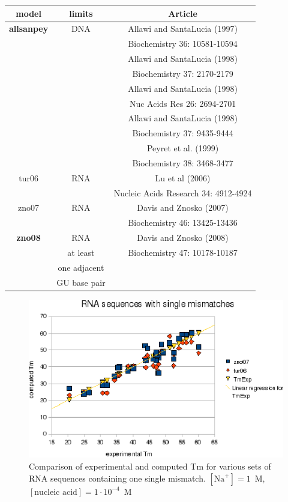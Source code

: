 \documentclass{article}
\begin{document}
\begin{table}[hc]
\begin{tabular}[h]{| c | c | c |}
\textbf{model} & \textbf{limits} & \textbf{Article} \\
 \hline
\textbf{allsanpey} & DNA & Allawi and SantaLucia (1997)\\
 & & Biochemistry 36: 10581-10594 \\
 & & Allawi and SantaLucia (1998)\\
 & & Biochemistry 37: 2170-2179 \\
 & & Allawi and SantaLucia (1998)\\
 & & Nuc Acids Res 26: 2694-2701 \\
 & & Allawi and SantaLucia (1998)\\
 & & Biochemistry 37: 9435-9444 \\
 & & Peyret et al. (1999)\\
 & & Biochemistry 38: 3468-3477 \\
 \hline 
tur06 & RNA & Lu et al (2006)\\
 & & Nucleic Acids Research 34: 4912-4924 \\
 \hline
zno07 & RNA & Davis and Znosko (2007)\\
 & & Biochemistry 46: 13425-13436 \\
 \hline
\textbf{zno08} & RNA & Davis and Znosko (2008)\\
 & at least & Biochemistry 47: 10178-10187 \\
 & one adjacent & \\
 & GU base pair & \\
 \hline
\end{tabular}
\end{table}
\pagebreak

\begin{figure}[h]
\includegraphics[width=1\linewidth]{images/RNASingleMismatch}
\caption{Comparison of experimental and computed Tm for various sets of
 RNA sequences containing one single mismatch. $[\mbox{Na}^+] = 1$~M, $[\mbox{nucleic acid}] = 1\cdot{}10^{-4}$~M}
\end{figure}
\end{document}
